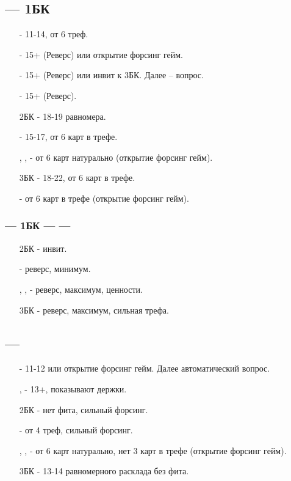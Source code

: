 \documentclass{article}
\begin{document}
\subsection{ --- 1БК}
\begin{enumerate}
    \item[\cl{2}] - 11-14, от 6 треф.
    \item[\di{2}] - 15+  (Реверс) или открытие форсинг гейм.
    \item[\he{2}] - 15+  (Реверс) или инвит к 3БК. Далее  -- вопрос.
    \item[\sp{2}] - 15+  (Реверс).
    \item[2БК] - 18-19 равномера.
    \item[\cl{3}] - 15-17, от 6 карт в трефе.
    \item[\di{3}, \he{3}, \sp{3}] - от 6 карт натурально (открытие форсинг гейм).
    \item[3БК] - 18-22, от 6 карт в трефе.
    \item[\cl{4}] - от 6 карт в трефе (открытие форсинг гейм).
\end{enumerate}
\subsubsection{ --- 1БК ---  --- }
\begin{enumerate}
    \item[2БК] - инвит.
    \item[\cl{3}] - реверс, минимум.
    \item[\di{3}, \he{3}, \sp{3}] - реверс, максимум, ценности.
    \item[3БК] - реверс, максимум, сильная трефа.
\end{enumerate}
\subsection{ --- }
\begin{enumerate}
    \item[\di{2}] - 11-12 или открытие форсинг гейм. Далее  автоматический вопрос.
    \item[\he{2}, \sp{2}] - 13+, показывают держки.
    \item[2БК] - нет фита, сильный форсинг.
    \item[\cl{3}] - от 4 треф, сильный форсинг.
    \item[\di{3}, \he{3}, \sp{3}] - от 6 карт натурально, нет 3 карт в трефе (открытие форсинг гейм).
    \item[3БК] - 13-14 равномерного расклада без фита.
\end{enumerate}
\end{document}
